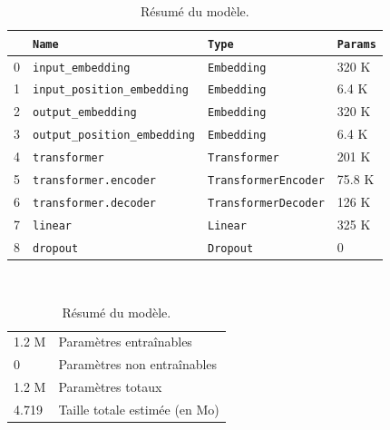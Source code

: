 \begin{table}[hbt]
    \begin{center}
        \begin{tabular}{|l|l|l|l|}
            \cline{2-4}
            \multicolumn{1}{c|}{}& \verb|Name|& \verb|Type|         & \verb|Params|                     \\
            \hline
            0                    & \verb|input_embedding|           & \verb|Embedding|          & 320 K \\
            \hline
            1                    & \verb|input_position_embedding|  & \verb|Embedding|          & 6.4 K \\
            \hline
            2                    & \verb|output_embedding|          & \verb|Embedding|          & 320 K \\
            \hline
            3                    & \verb|output_position_embedding| & \verb|Embedding|          & 6.4 K \\
            \hline
            4                    & \verb|transformer|               & \verb|Transformer|        & 201 K \\
            \hline
            5                    & \verb|transformer.encoder|       & \verb|TransformerEncoder| & 75.8 K\\
            \hline
            6                    & \verb|transformer.decoder|       & \verb|TransformerDecoder| & 126 K \\
            \hline
            7                    & \verb|linear|                    & \verb|Linear|             & 325 K \\
            \hline
            8                    & \verb|dropout|                   & \verb|Dropout|            & 0     \\
            \hline
        \end{tabular}
        \ \\[.5cm]
        \begin{tabular}{ll}
            1.2 M & Paramètres entraînables       \\
            0     & Paramètres non entraînables   \\
            1.2 M & Paramètres totaux             \\
            4.719 & Taille totale estimée (en Mo) \\
        \end{tabular}
    \end{center}
    \caption{Résumé du modèle.}
    \label{tab.model-summary}
\end{table}

